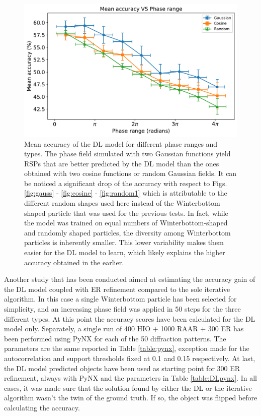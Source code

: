 \begin{figure}[H]
    \centering
    \includegraphics[width=\textwidth]{figures/Phasing/plot_acc_comp_allFINAL.pdf}
    \caption{Mean accuracy of the DL model for different phase ranges and types. The phase field simulated with two Gaussian 
    functions yield RSPs that are better predicted by the DL model than the ones obtained with two cosine functions or 
    random Gaussian fields. It can be noticed a significant drop of the accuracy with respect to Figs. \ref{fig:gauss} 
    - \ref{fig:cosine} - \ref{fig:random1} which is attributable to the different random shapes used here instead of 
    the Winterbottom shaped particle that was used for the previous tests. In fact, while the model was trained on 
    equal numbers of Winterbottom-shaped and randomly shaped particles, the diversity among Winterbottom particles 
    is inherently smaller. This lower variability makes them easier for the DL model to learn, which likely explains 
    the higher accuracy obtained in the earlier. }

    \label{fig:compa_all}
\end{figure}

Another study that has been conducted aimed at estimating the accuracy gain of the DL model coupled with ER refinement 
compared to the sole iterative algorithm. In this case a single Winterbottom particle has been selected for simplicity, 
and an increasing phase field was applied in 50 steps for the three different types. At this point the accuracy scores 
have been calculated for the DL model only. Separately, a single run of 400 HIO + 1000 RAAR + 300 ER has been 
performed using PyNX for each of the 50 diffraction patterns. The parameters are the same reported in Table \ref{table:pynx}, 
exception made for the autocorrelation and support thresholds fixed at 0.1 and 0.15 respectively. At last, the DL 
model predicted objects have been used as starting point for 300 ER refinement, always with PyNX and the parameters in 
Table \ref{table:DLpynx}. In all cases, it was made sure that the solution found by either 
the DL or the iterative algorithm wasn't the twin of the ground truth. If so, the object was flipped before calculating 
the accuracy. 

